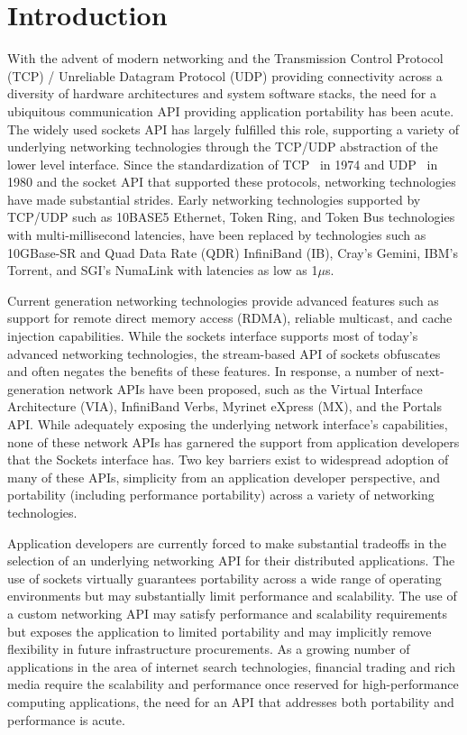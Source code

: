 \section{Introduction}

With the advent of modern networking and the Transmission Control
Protocol (TCP) / Unreliable Datagram Protocol (UDP) providing
connectivity across a diversity of hardware architectures and system
software stacks, the need for a ubiquitous communication API providing
application portability has been acute. The widely used sockets API
has largely fulfilled this role, supporting a variety of underlying
networking technologies through the TCP/UDP abstraction of the lower
level interface. Since the standardization of TCP~\cite{tcp-rfc-675}
in 1974 and UDP~\cite{udp-rfc-768} in 1980 and the socket API that
supported these protocols, networking technologies have made
substantial strides. Early networking technologies supported by
TCP/UDP such as 10BASE5 Ethernet, Token Ring, and Token Bus
technologies with multi-millisecond latencies, have been replaced by
technologies such as 10GBase-SR and Quad Data Rate (QDR) InfiniBand
(IB), Cray's Gemini, IBM's Torrent, and SGI's NumaLink with latencies
as low as 1$\mu$s.

Current generation networking technologies provide advanced features
such as support for remote direct memory access (RDMA), reliable
multicast, and cache injection capabilities. While the sockets
interface supports most of today's advanced networking technologies,
the stream-based API of sockets obfuscates and often negates the
benefits of these features. In response, a number of next-generation
network APIs have been proposed, such as the Virtual Interface
Architecture (VIA), InfiniBand Verbs, Myrinet eXpress (MX), and the
Portals API. While adequately exposing the underlying network
interface's capabilities, none of these network APIs has garnered the
support from application developers that the Sockets interface has. Two
key barriers exist to widespread adoption of many of these APIs,
simplicity from an application developer perspective, and portability
(including performance portability) across a variety of networking
technologies.

Application developers are currently forced to make substantial
tradeoffs in the selection of an underlying networking API for their
distributed applications. The use of sockets virtually guarantees
portability across a wide range of operating environments but may
substantially limit performance and scalability. The use of a custom
networking API may satisfy performance and scalability requirements
but exposes the application to limited portability and may implicitly
remove flexibility in future infrastructure procurements. As a growing
number of applications in the area of internet search technologies,
financial trading and rich media require the scalability and
performance once reserved for high-performance computing applications,
the need for an API that addresses both portability and performance is
acute.

